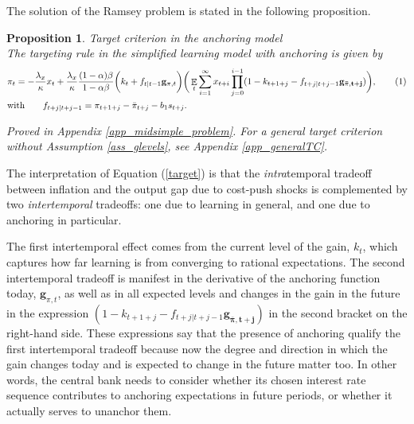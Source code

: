 \documentclass[11pt]{article}
\renewcommand{\[}{\begin{equation}}
\renewcommand{\]}{\end{equation}}
\newtheorem{prop}{Proposition}
\DeclareMathOperator{\E}{\mathbb{E}}
\newcommand\numberthis{\addtocounter{equation}{1}\tag{\theequation}} %
\begin{document}
The solution of the Ramsey problem is stated in the following proposition.

\begin{prop} Target criterion in the anchoring model \\
The targeting rule in the simplified learning model with anchoring is given by
\begin{align*}
& \pi_t = -\frac{\lambda_x}{\kappa}x_t + \frac{\lambda_x}{\kappa}\frac{(1-\alpha)\beta}{1-\alpha\beta} \bigg(k_t+f_{t|t-1}\mathbf{g}_{\pi,t} \bigg)\bigg(\E_t\sum_{i=1}^{\infty}x_{t+i}\prod_{j=0}^{i-1}(1-k_{t+1+j} - f_{t+j|t+j-1}\mathbf{g_{\bar{\pi},t+j}}) \bigg),
 \numberthis \label{target} \\
 & \text{with} \quad \quad f_{t+j|t+j-1} = \pi_{t+1+j} - \bar{\pi}_{t+j}-b_1 s_{t+j}.
\end{align*}

Proved in Appendix \ref{app_midsimple_problem}. For a general target criterion without Assumption \ref{ass_glevels}, see Appendix \ref{app_generalTC}.
\label{result_target_anchoring}
\end{prop}
The interpretation of Equation (\ref{target}) is that the \emph{intra}temporal tradeoff between inflation and the output gap due to cost-push shocks is complemented by two \emph{intertemporal} tradeoffs: one due to learning in general, and one due to anchoring in particular. 

The first intertemporal effect comes from the current level of the gain,  $k_t$, which captures how far learning is from converging to rational expectations. The second intertemporal tradeoff is manifest in the derivative of the anchoring function today,  $\mathbf{g}_{\pi,t}$, as well as in all expected levels and changes in the gain in the future in the expression $(1-k_{t+1+j}- f_{t+j|t+j-1}\mathbf{g_{\bar{\pi},t+j}})$ in the second bracket on the right-hand side. These expressions say that the presence of anchoring qualify the first intertemporal tradeoff because now the degree and direction in which the gain changes today and is expected to change in the future matter too. In other words, the central bank needs to consider whether its chosen interest rate sequence contributes to anchoring expectations in future periods, or whether it actually serves to unanchor them.
\end{document}

